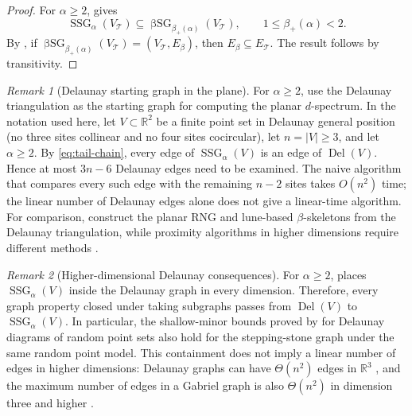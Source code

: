 \documentclass[a4paper,fleqn]{cas-sc}
\theoremstyle{definition}
\theoremstyle{remark}
\newtheorem{remark}{Remark}
\newcommand{\R}{\mathds{R}}
\newcommand{\0}{\mathbf{0}}
\newcommand{\tr}[1]{#1}
\newcommand{\tfg}[1]{#1}
\newcommand{\tr}[1]{\textcolor[HTML]{aa0000}{#1}}
\newcommand{\tfg}[1]{\textcolor[HTML]{00FF00}{#1}}
\DeclareMathOperator{\SSG}{SSG}
\DeclareMathOperator{\BSG}{\beta SG}
\DeclareMathOperator{\Del}{Del}
\begin{document}
\begin{proof}
For $\alpha\geq2$,  gives
\begin{equation}
    \SSG_\alpha(V_{\mathcal T})
    \subseteq \BSG_{\beta_+(\alpha)}(V_{\mathcal T}),
    \qquad
    1\leq\beta_+(\alpha)<2.
\end{equation}
By \citet[Theorem~1]{maravillo2023cyclic}, if
$\BSG_{\beta_+(\alpha)}(V_{\mathcal T})=(V_{\mathcal T},E_\beta)$, then
$E_\beta\subseteq E_{\mathcal T}$.  The result follows by transitivity.
\end{proof}

\clearpage

\begin{remark}[\tfg{Delaunay starting graph in the plane}]
\label{rem:delaunay-candidates}
\tfg{For $\alpha\geq2$, \citet[Theorem~3.11 and Algorithm~1]
{kannangara2018stepping} use the Delaunay triangulation as the starting
graph for computing the planar $d$-spectrum.  In the notation used here,
let $V\subset\R^2$ be a finite point set in
Delaunay general position (no three sites collinear and no four sites
cocircular), let $n=|V|\geq3$, and let $\alpha\geq2$. By
\eqref{eq:tail-chain}, every edge of $\SSG_\alpha(V)$ is an edge of
$\Del(V)$. Hence at most $3n-6$ Delaunay edges need to be examined.  The
naive algorithm that compares every such edge with the remaining $n-2$
sites takes $O(n^2)$ time; the linear number of Delaunay edges alone does
not give a linear-time algorithm.  For comparison,
\citet{lingas1994linear} construct the planar RNG and lune-based
$\beta$-skeletons from the Delaunay triangulation, while proximity
algorithms in higher dimensions require different methods
\citep{dickerson1996algorithms}.}
\end{remark}

\begin{remark}[\tr{Higher-dimensional Delaunay consequences}]
\tr{For $\alpha\geq2$,  places
$\SSG_\alpha(V)$ inside the Delaunay graph in every dimension. Therefore,
every graph property closed under taking subgraphs passes from
$\Del(V)$ to $\SSG_\alpha(V)$. In particular, the shallow-minor bounds
proved by \citet{teng1998combinatorial} for Delaunay diagrams of random
point sets also hold for the stepping-stone graph under the same random
point model.  This containment does not imply a linear number of edges in
higher dimensions: Delaunay graphs can have $\Theta(n^2)$ edges in
$\R^3$ \citep{agarwal1992relative}, and the maximum number of edges in a
Gabriel graph is also $\Theta(n^2)$ in dimension three and higher
\citep[Lemma~5.1]{chazelle1994selecting}.}
\end{remark}
\end{document}
